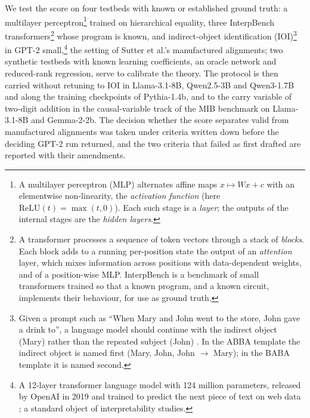 \documentclass[11pt,a4paper]{article}
\begin{document}
We test the score on four testbeds with known or established ground truth: a multilayer perceptron\footnote{A multilayer perceptron (MLP) alternates affine maps $x\mapsto Wx+c$ with an elementwise non-linearity, the \emph{activation function} (here $\mathrm{ReLU}(t)=\max(t,0)$). Each such stage is a \emph{layer}; the outputs of the internal stages are the \emph{hidden layers}.} trained on hierarchical equality, three InterpBench transformers\footnote{A transformer processes a sequence of token vectors through a stack of \emph{blocks}. Each block adds to a running per-position state the output of an \emph{attention} layer, which mixes information across positions with data-dependent weights, and of a position-wise MLP. InterpBench \cite{interpbench2024} is a benchmark of small transformers trained so that a known program, and a known circuit, implements their behaviour, for use as ground truth.} whose program is known, and indirect-object identification (IOI)\footnote{Given a prompt such as ``When Mary and John went to the store, John gave a drink to'', a language model should continue with the indirect object (Mary) rather than the repeated subject (John) \cite{wang2023ioi}. In the ABBA template the indirect object is named first (Mary, John, John $\to$ Mary); in the BABA template it is named second.} in GPT-2 small,\footnote{A 12-layer transformer language model with 124 million parameters, released by OpenAI in 2019 and trained to predict the next piece of text on web data \cite{radford2019}; a standard object of interpretability studies.} the setting of Sutter et al.'s manufactured alignments; two synthetic testbeds with known learning coefficients, an oracle network and reduced-rank regression, serve to calibrate the theory. The protocol is then carried without retuning to IOI in Llama-3.1-8B, Qwen2.5-3B and Qwen3-1.7B and along the training checkpoints of Pythia-1.4b, and to the carry variable of two-digit addition in the causal-variable track of the MIB benchmark \cite{mib2025} on Llama-3.1-8B and Gemma-2-2b. The decision whether the score separates valid from manufactured alignments was taken under criteria written down before the deciding GPT-2 run returned, and the two criteria that failed as first drafted are reported with their amendments.
\end{document}
